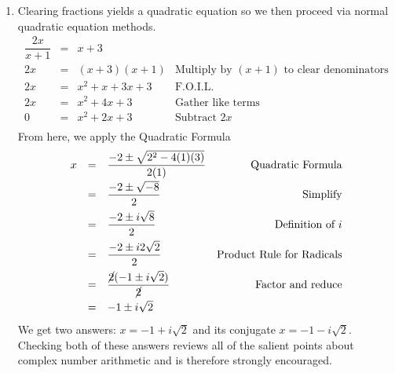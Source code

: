 \documentclass{ximera}
\begin{document}
\begin{exampleSol}
    \begin{enumerate}
        \enlargethispage{20pt}
        \item  Clearing fractions yields a quadratic equation so we then proceed via normal quadratic equation methods. %
        \[ 
            \begin{array}{rclr}
                \dfrac{2x}{x+1} & = &  x+3 & \\[5pt]
                            2x  & = & (x+3)(x+1) & \text{Multiply by $(x+1)$ to clear denominators} \\
                            2x  & = & x^2 + x + 3x + 3 & \text{F.O.I.L.} \\
                            2x  & = & x^2 + 4x + 3 & \text{Gather like terms} \\
                            0   & = & x^2 + 2x + 3 & \text{Subtract $2x$} \\
            \end{array}
        \] 
        From here, we apply the Quadratic Formula 
        \[ 
            \begin{array}{rclr}
                x   & = & \dfrac{-2 \pm \sqrt{2^2 - 4(1)(3)}}{2(1)}  & \text{Quadratic Formula}\\[8pt]
                    & = &  \dfrac{-2 \pm \sqrt{-8}}{2} & \text{Simplify}\\[8pt]
                    & = & \dfrac{-2 \pm i \sqrt{8}}{2} & \text{Definition of $i$}\\[8pt]
                    & = & \dfrac{-2 \pm i 2\sqrt{2}}{2} & \text{Product Rule for Radicals}\\[8pt]
                    & = & \dfrac{\cancel{2}(-1 \pm i\sqrt{2})}{\cancel{2}} & \text{Factor and reduce}\\[8pt]
                    & = & -1 \pm i \sqrt{2} & \\
            \end{array} 
        \]
        We get two answers: $x = -1 + i\sqrt{2}$ and its conjugate $x = -1 - i\sqrt{2}$.  Checking both of these answers reviews all of the salient points about complex number arithmetic and is therefore strongly encouraged.
        

\end{enumerate}
\end{exampleSol}
\end{document}
